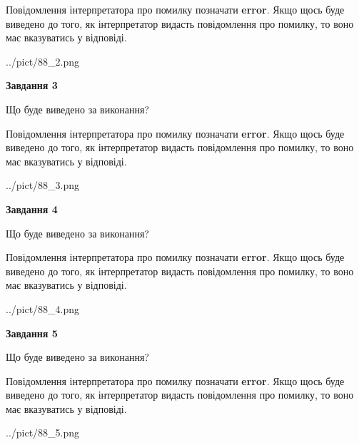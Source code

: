 \documentclass[12pt, ukrainian]{article}
\begin{document}
{\begin {large}
Повідомлення інтерпретатора про помилку позначати \textbf{error}.
Якщо щось буде виведено до того, як інтерпретатор видасть повідомлення про помилку, 
то воно має вказуватись у відповіді. \par


\begin{center}
	{../pict/88_2.png}
\end{center}
\newpage

{\begin {center}\textbf{Завдання 3}\end {center}}\par
Що буде виведено за виконання?

Повідомлення інтерпретатора про помилку позначати \textbf{error}.
Якщо щось буде виведено до того, як інтерпретатор видасть повідомлення про помилку, 
то воно має вказуватись у відповіді. \par


\begin{center}
	{../pict/88_3.png}
\end{center}
\newpage

{\begin {center}\textbf{Завдання 4}\end {center}}\par
Що буде виведено за виконання?

Повідомлення інтерпретатора про помилку позначати \textbf{error}.
Якщо щось буде виведено до того, як інтерпретатор видасть повідомлення про помилку, 
то воно має вказуватись у відповіді. \par


\begin{center}
	{../pict/88_4.png}
\end{center}
\newpage

{\begin {center}\textbf{Завдання 5}\end {center}}\par
Що буде виведено за виконання?

Повідомлення інтерпретатора про помилку позначати \textbf{error}.
Якщо щось буде виведено до того, як інтерпретатор видасть повідомлення про помилку, 
то воно має вказуватись у відповіді. \par


\begin{center}
	{../pict/88_5.png}
\end{center}
\newpage


\end{large}}
\end{document}
